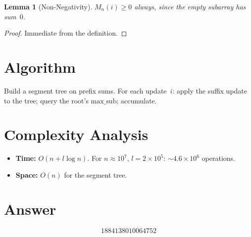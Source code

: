 \documentclass[11pt]{article}
\newtheorem{lemma}[theorem]{Lemma}
\begin{document}
\begin{lemma}[Non-Negativity]
$M_n(i)\ge 0$ always, since the empty subarray has sum~$0$.
\end{lemma}

\begin{proof}
Immediate from the definition.
\end{proof}

\section{Algorithm}

Build a segment tree on prefix sums. For each update~$i$: apply the suffix update to the tree; query the root's $\mathrm{max\_sub}$; accumulate.

\section{Complexity Analysis}

\begin{itemize}
\item \textbf{Time:} $O(n + l\log n)$. For $n\approx 10^7$, $l=2\times 10^5$: $\sim 4.6\times 10^6$ operations.
\item \textbf{Space:} $O(n)$ for the segment tree.
\end{itemize}

\section{Answer}

\[
\boxed{1884138010064752}
\]
\end{document}
